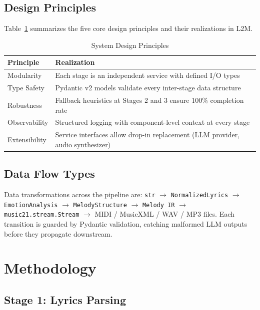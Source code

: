 \documentclass[conference]{IEEEtran}
\begin{document}
\subsection{Design Principles}

Table~\ref{tab:design_principles} summarizes the five core design principles
and their realizations in L2M.

\begin{table}[htbp]
\caption{System Design Principles}
\label{tab:design_principles}
\centering
\begin{tabular}{@{}p{2.0cm}p{5.5cm}@{}}
\toprule
\textbf{Principle} & \textbf{Realization} \\
\midrule
Modularity      & Each stage is an independent service with defined I/O types \\
Type Safety     & Pydantic v2 models validate every inter-stage data structure \\
Robustness      & Fallback heuristics at Stages 2 and 3 ensure 100\% completion rate \\
Observability   & Structured logging with component-level context at every stage \\
Extensibility   & Service interfaces allow drop-in replacement (LLM provider, audio synthesizer) \\
\bottomrule
\end{tabular}
\end{table}

\subsection{Data Flow Types}

Data transformations across the pipeline are:
\texttt{str} $\to$ \texttt{NormalizedLyrics} $\to$ \texttt{EmotionAnalysis} $\to$
\texttt{MelodyStructure} $\to$ \texttt{Melody IR} $\to$ \texttt{music21.stream.Stream}
$\to$ MIDI / MusicXML / WAV / MP3 files.
Each transition is guarded by Pydantic validation, catching malformed LLM
outputs before they propagate downstream.

\section{Methodology}

\subsection{Stage 1: Lyrics Parsing}
\end{document}
